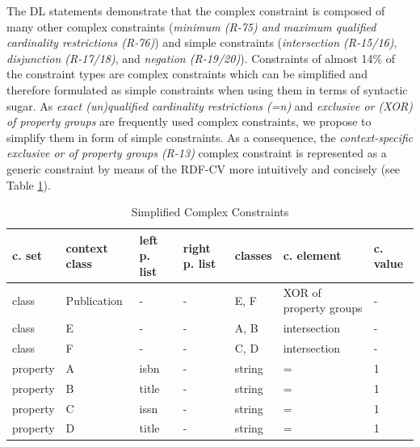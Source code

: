 \documentclass[a4paper,fontsize=11pt]{scrartcl}
\begin{document}
The DL statements demonstrate that the complex constraint is composed of many other complex constraints (\emph{minimum (R-75) and maximum qualified cardinality restrictions (R-76)}) and simple constraints (\emph{intersection (R-15/16)}, \emph{disjunction (R-17/18)}, and \emph{negation (R-19/20)}). Constraints of almost 14\% of the constraint types are complex constraints which can be simplified and therefore formulated as simple constraints when using them in terms of syntactic sugar. As \emph{exact (un)qualified cardinality restrictions (=n)} and \emph{exclusive or (XOR) of property groups} are frequently used complex constraints, we propose to simplify them in form of simple constraints. As a consequence, the \emph{context-specific exclusive or of property groups (R-13)} complex constraint is represented as a generic constraint by means of the RDF-CV more intuitively and concisely (see Table \ref{tab:simplified-complex-constraints}).


\begin{table}[H]
  \scriptsize
  \sffamily
  \vspace{0cm}
	\caption{Simplified Complex Constraints}
	\label{tab:simplified-complex-constraints}
	\centering
		\begin{tabular}{l|l|l|l|l|l|l}
      \textbf{c. set} & \textbf{context class} & \textbf{left p. list} & \textbf{right p. list} & \textbf{classes} & \textbf{c. element} & \textbf{c. value} \\
      \hline
class & Publication & - & - & E, F & XOR of property groups & - \\
class & E & - & - & A, B & intersection & - \\
class & F & - & - & C, D & intersection & - \\
property & A & isbn & - & string & = & 1 \\
property & B & title & - & string & = & 1 \\
property & C & issn & - & string & = & 1 \\
property & D & title & - & string & = & 1 \\
		\end{tabular}
\end{table}
\end{document}
